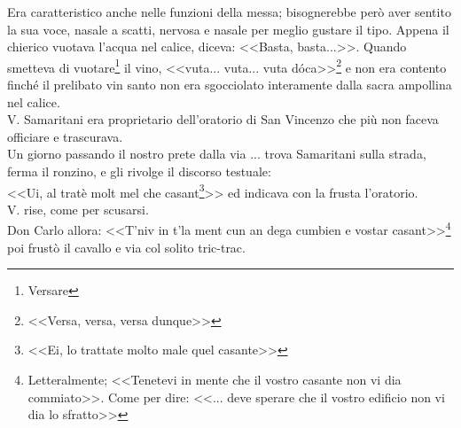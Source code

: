 Era caratteristico anche nelle funzioni della messa; bisognerebbe però aver sentito la sua voce, nasale a scatti, nervosa e nasale per meglio gustare il tipo. Appena il chierico vuotava l'acqua nel calice, diceva: <<Basta, basta...>>. Quando smetteva di vuotare\footnote{Versare} il vino, <<vuta... vuta... vuta dóca>>\footnote{<<Versa, versa, versa dunque>>} e non era contento finché il prelibato vin santo non era sgocciolato interamente dalla sacra ampollina nel calice.\\
V. Samaritani era proprietario dell'oratorio di San Vincenzo che più non faceva officiare e trascurava.\\
Un giorno passando il nostro prete dalla via ... trova Samaritani sulla strada, ferma il ronzino, e gli rivolge il discorso testuale:\\
\indent <<Ui, al tratè molt mel che casant\footnote{<<Ei, lo trattate molto male quel casante>>}>> ed indicava con la frusta l'oratorio.\\
\indent V. rise, come per scusarsi.\\
\indent Don Carlo allora: <<T'niv in t'la ment cun an dega cumbien e vostar casant>>\footnote{Letteralmente; <<Tenetevi in mente che il vostro casante non vi dia commiato>>. Come per dire: <<... deve sperare che il vostro edificio non vi dia lo sfratto>>} poi frustò il cavallo e via col solito tric-trac.\\

